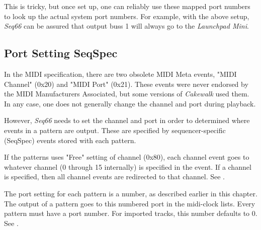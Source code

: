    This is tricky, but once set up,
   one can reliably use these mapped port numbers to look up the actual
   system port numbers.  For example, with the above setup, \textsl{Seq66} can
   be assured that output buss 1 will always go to the
   \textsl{Launchpad Mini}.

\subsection{Port Setting SeqSpec}
\label{subsec:port_seqspec}

   In the MIDI specification, there are two obsolete MIDI Meta events,
   "MIDI Channel" (0x20) and "MIDI Port" (0x21).
   These events were never endorsed by the MIDI Manufacturers Associated,
   but some versions of \textsl{Cakewalk} used them.
   In any case, one does not generally change the channel and port during
   playback.

   However, \textsl{Seq66} needs to set the channel and port in order to
   determined where events in a pattern are output.
   These are specified by sequencer-specific (SeqSpec) events stored with
   each pattern.

   If the patterns uses "Free" setting of channel (0x80), each channel event
   goes to whatever channel (0 through 15 internally) is specified in the event.
   If a channel is specified, then all channel events are redirected to that
   channel.
   See .

   The port setting for each pattern is a number, as described earlier in
   this chapter.
   The output of a pattern goes to this numbered port in the midi-clock
   lists.
   Every pattern must have a port number.
   For imported tracks, this number defaults to 0.
   See .


